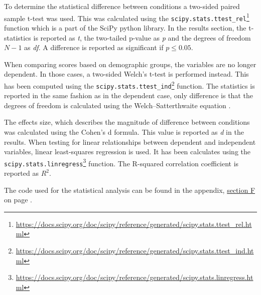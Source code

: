To determine the statistical difference between conditions a two-sided paired sample t-test was used. This was calculated using the \texttt{scipy.stats.ttest\_rel}\footnote{\url{https://docs.scipy.org/doc/scipy/reference/generated/scipy.stats.ttest_rel.html}} function which is a part of the SciPy python library. In the results section, the t-statistics is reported as \emph{t}, the two-tailed p-value as \emph{p} and the degrees of freedom $N-1$ as \emph{df}. A difference is reported as significant if $p\le 0.05$.

When comparing scores based on demographic groups, the variables are no longer dependent. In those cases, a two-sided Welch’s t-test is performed instead. This has been computed using the \texttt{scipy.stats.ttest\_ind}\footnote{\url{https://docs.scipy.org/doc/scipy/reference/generated/scipy.stats.ttest_ind.html}} function. The statistics is reported in the same fashion as in the dependent case, only difference is that the degrees of freedom is calculated using the Welch–Satterthwaite equation \citep{Allwood2008}.

The effects size, which describes the magnitude of difference between conditions was calculated using the Cohen's d formula. This value is reported as \emph{d} in the results. When testing for linear relationships between dependent and independent variables, linear least-squares regression is used. It has been calculates using the \texttt{scipy.stats.linregress}\footnote{\url{https://docs.scipy.org/doc/scipy/reference/generated/scipy.stats.linregress.html}} function. The R-squared correlation coefficient is reported as $R^2$.

The code used for the statistical analysis can be found in the appendix, \hyperref[appAnalysis]{section F} on page \pageref{appAnalysis}.